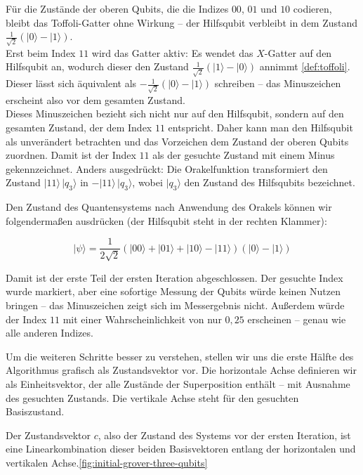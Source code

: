 { Für die Zustände der oberen Qubits, die die Indizes $00$, $01$ und $10$ codieren, bleibt das Toffoli-Gatter ohne Wirkung – der Hilfsqubit verbleibt in dem Zustand $\frac{1}{\sqrt{2}}(|0\rangle - |1\rangle)$.\\

 Erst beim Index $11$ wird das Gatter aktiv: Es wendet das $X$-Gatter auf den Hilfsqubit an, wodurch dieser den Zustand $\frac{1}{\sqrt{2}}(|1\rangle - |0\rangle)$ annimmt \ref{def:toffoli}. Dieser lässt sich äquivalent als $-\frac{1}{\sqrt{2}}(|0\rangle - |1\rangle)$ schreiben – das Minuszeichen erscheint also vor dem gesamten Zustand.\\

 Dieses Minuszeichen bezieht sich nicht nur auf den Hilfsqubit, sondern auf den gesamten Zustand, der dem Index $11$ entspricht. Daher kann man den Hilfsqubit als unverändert betrachten und das Vorzeichen dem Zustand der oberen Qubits zuordnen. Damit ist der Index $11$ als der gesuchte Zustand mit einem Minus gekennzeichnet. Anders ausgedrückt: Die Orakelfunktion transformiert den Zustand $|11\rangle\,|q_{\text{3}}\rangle$ in $-|11\rangle\,|q_{\text{3}}\rangle$, wobei $|q_{\text{3}}\rangle$ den Zustand des Hilfsqubits bezeichnet.

Den Zustand des Quantensystems nach Anwendung des Orakels können wir folgendermaßen ausdrücken (der Hilfsqubit steht in der rechten Klammer):

$$
|\psi\rangle = \frac{1}{2\sqrt{2}} (|00\rangle + |01\rangle + |10\rangle - |11\rangle)(|0\rangle - |1\rangle)
$$

Damit ist der erste Teil der ersten Iteration abgeschlossen. Der gesuchte Index wurde markiert, aber eine sofortige Messung der Qubits würde keinen Nutzen bringen – das Minuszeichen zeigt sich im Messergebnis nicht. Außerdem würde der Index $11$ mit einer Wahrscheinlichkeit von nur $0{,}25$ erscheinen – genau wie alle anderen Indizes.

Um die weiteren Schritte besser zu verstehen, stellen wir uns die erste Hälfte des Algorithmus grafisch als Zustandsvektor vor. Die horizontale Achse definieren wir als Einheitsvektor, der alle Zustände der Superposition enthält – mit Ausnahme des gesuchten Zustands. Die vertikale Achse steht für den gesuchten Basiszustand.

Der Zustandsvektor $c$, also der Zustand des Systems vor der ersten Iteration, ist eine Linearkombination dieser beiden Basisvektoren entlang der horizontalen und vertikalen Achse.\ref{fig:initial-grover-three-qubits}

}
